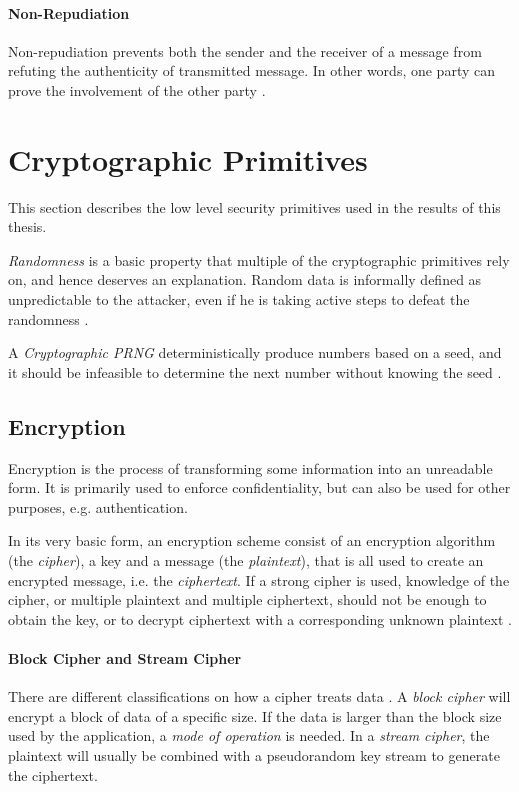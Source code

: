 \documentclass[pdftex,english,10pt,b5paper,twoside]{book}
\begin{document}
\paragraph{Non-Repudiation} Non-repudiation prevents both the sender and the
receiver of a message from refuting the authenticity of transmitted message. In
other words, one party can prove the involvement of the other party
\cite{stallings}.

\section{Cryptographic Primitives}

This section describes the low level security primitives used in the results of
this thesis.

\emph{Randomness} is a basic property that multiple of the cryptographic
primitives rely on, and hence deserves an explanation. Random data is
informally defined as unpredictable to the attacker, even if he is taking
active steps to defeat the randomness \cite[p. 137]{schneier}.

A \emph{Cryptographic \ac{PRNG}} deterministically produce numbers based on a
seed, and it should be infeasible to determine the next number without knowing
the seed \cite[p. 140]{schneier}.

\subsection{Encryption}

Encryption is the process of transforming some information into an unreadable
form. It is primarily used to enforce confidentiality, but can also be
used for other purposes, e.g. authentication.

In its very basic form, an encryption scheme consist of an encryption algorithm
(the \emph{cipher}), a key and a message (the \emph{plaintext}), that is all
used to create an encrypted message, i.e. the \emph{ciphertext}. If a strong
cipher is used, knowledge of the cipher, or multiple plaintext and multiple
ciphertext, should not be enough to obtain the key, or to decrypt ciphertext
with a corresponding unknown plaintext \cite{schneier}.

\paragraph{Block Cipher and Stream Cipher} There are different classifications
on how a cipher treats data \cite[p. 32]{stallings}. A \emph{block cipher} will
encrypt a block of data of a specific size. If the data is larger than the
block size used by the application, a \emph{mode of operation} is needed. In a
\emph{stream cipher}, the plaintext will usually be combined with a pseudorandom key
stream to generate the ciphertext.
\end{document}
